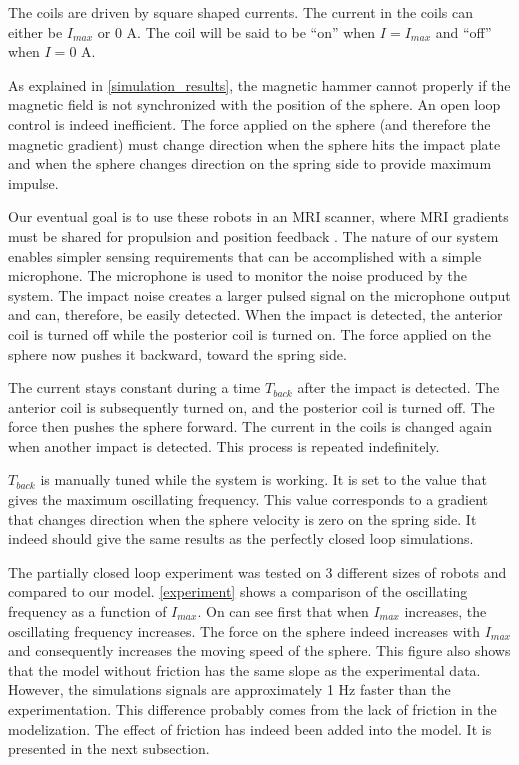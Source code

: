 \documentclass[letterpaper, 10 pt, conference]{ieeeconf}  %
\begin{document}
The coils are driven by square shaped currents. The current in the coils can either be $I_{max}$ or 0 A. The coil will be said to be “on” when $I=I_{max}$ and “off” when $I=0$ A.\par
As explained in \cref{simulation_results}, the magnetic hammer cannot properly if the magnetic field is not synchronized with the position of the sphere. An open loop control is indeed inefficient. The force applied on the sphere (and therefore the magnetic gradient) must change direction when the sphere hits the impact plate and when the sphere changes direction on the spring side to provide maximum impulse.\par
Our eventual goal is to use these robots in an MRI scanner, where MRI gradients must be shared for propulsion and position feedback \cite{578}. The nature of our system enables simpler sensing requirements that can be accomplished with a simple microphone. The microphone is used to monitor the noise produced by the system. The impact noise creates a larger pulsed signal on the microphone output and can, therefore, be easily detected. When the impact is detected, the anterior coil is turned off while the posterior coil is turned on. The force applied on the sphere now pushes it backward, toward the spring side.\par
The current stays constant during a time $T_{back}$ after the impact is detected. The anterior coil is subsequently turned on, and the posterior coil is turned off. The force then pushes the sphere forward. The current in the coils is changed again when another impact is detected. This process is repeated indefinitely.\par
$T_{back}$ is manually tuned while the system is working. It is set to the value that gives the maximum oscillating frequency. This value corresponds to a gradient that changes direction when the sphere velocity is zero on the spring side. It indeed should give the same results as the perfectly closed loop simulations.\par
The partially closed loop experiment was tested on 3 different sizes of robots and compared to our model. \cref{experiment} shows a comparison of the oscillating frequency as a function of $I_{max}$. On can see first that when $I_{max}$ increases, the oscillating frequency increases. The force on the sphere indeed increases with $I_{max}$ and consequently increases the moving speed of the sphere.
This figure also shows that the model without friction has the same slope as the experimental data. However, the simulations signals are approximately 1 Hz faster than the experimentation. This difference probably comes from the lack of friction in the modelization. The effect of friction has indeed been added into the model. It is presented in the next subsection.
\end{document}
